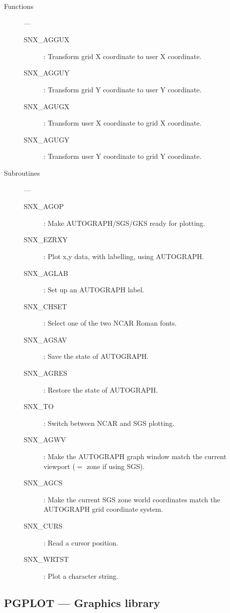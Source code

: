 \begin{description}

\item [Functions] ---

\begin{description}
\item [SNX\_AGGUX] : Transform grid X coordinate to user X coordinate.
\item [SNX\_AGGUY] : Transform grid Y coordinate to user Y coordinate.
\item [SNX\_AGUGX] : Transform user X coordinate to grid X coordinate.
\item [SNX\_AGUGY] : Transform user Y coordinate to grid Y coordinate.
\end{description}

\item [Subroutines] ---

\begin{description}
\item [SNX\_AGOP] : Make AUTOGRAPH/SGS/GKS ready for plotting.
\item [SNX\_EZRXY] : Plot x,y data, with labelling, using AUTOGRAPH.
\item [SNX\_AGLAB] : Set up an AUTOGRAPH label.
\item [SNX\_CHSET] : Select one of the two NCAR Roman fonts.
\item [SNX\_AGSAV] : Save the state of AUTOGRAPH.
\item [SNX\_AGRES] : Restore the state of AUTOGRAPH.
\item [SNX\_TO] : Switch between NCAR and SGS plotting.
\item [SNX\_AGWV] : Make the AUTOGRAPH graph window match the current viewport
 ($=$ zone if using SGS).
\item [SNX\_AGCS] : Make the current SGS zone world coordinates match the
      AUTOGRAPH grid coordinate system.
\item [SNX\_CURS] : Read a cursor position.
\item [SNX\_WRTST] : Plot a character string.
\end{description}

\end{description}

\newpage

\subsection{PGPLOT --- Graphics library}

